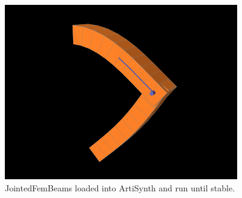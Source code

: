 \begin{figure}[ht]
	\centering
	\includegraphics[width=\imglength]{images/JointedFemBeams}
	\caption{JointedFemBeams loaded into ArtiSynth and run until stable.}
	\label{fig:fem:jointFemBeams}
\end{figure}

